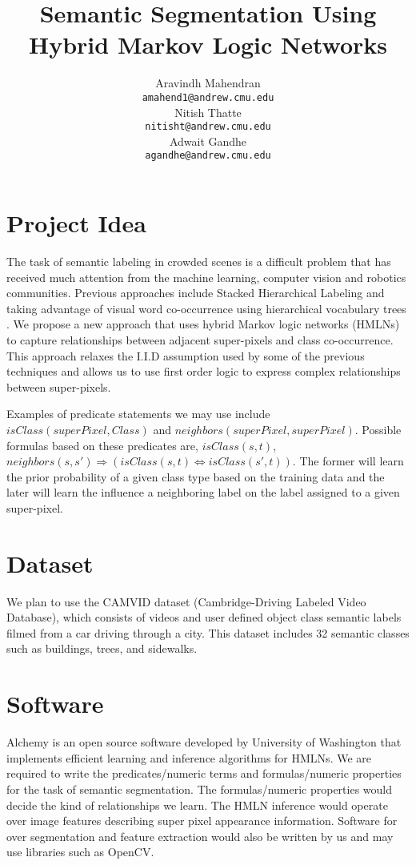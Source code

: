 \documentclass{article} %
\title{Semantic Segmentation Using Hybrid Markov Logic Networks}
\author{
Aravindh Mahendran \\
\texttt{amahend1@andrew.cmu.edu} \\ 
\And
Nitish Thatte \\
\texttt{nitisht@andrew.cmu.edu} \\
\AND
Adwait Gandhe \\
\texttt{agandhe@andrew.cmu.edu} \\
}
\begin{document}
\maketitle
\section{Project Idea}
\vspace{-0.125in}

The task of semantic labeling in crowded scenes is a difficult problem that has received much attention from the machine learning, computer vision and robotics communities. 
Previous approaches include Stacked Hierarchical Labeling \cite{Munoz:2010:SHL:1888212.1888218} and taking advantage of visual word co-occurrence using hierarchical vocabulary trees \cite{Micusik08032012}. 
We propose a new approach that uses hybrid Markov logic networks (HMLNs) \cite{Wang:2008:HML:1620163.1620244} to capture relationships between adjacent super-pixels and class co-occurrence.
This approach relaxes the I.I.D assumption used by some of the previous techniques and allows us to use first order logic to express complex relationships between super-pixels.

Examples of predicate statements we may use include $isClass(superPixel, Class)$ and $neighbors(superPixel, superPixel)$. Possible formulas based on these predicates are, $isClass(s,t)$, $neighbors(s,s') \Rightarrow \left( isClass(s, t) \Leftrightarrow isClass(s', t) \right)$. The former will learn the prior probability of a given class type based on the training data and the later will learn the influence a neighboring label on the label assigned to a given super-pixel. 
	
\vspace{-0.125in}
\section{Dataset}
\vspace{-0.125in}
We plan to use the CAMVID dataset (Cambridge-Driving Labeled Video Database), which consists of videos and user defined object class semantic labels filmed from a car driving through a city.
This dataset includes 32 semantic classes such as buildings, trees, and sidewalks. 

\vspace{-0.125in}
\section{Software}
\vspace{-0.125in}
Alchemy is an open source software developed by University of Washington that implements efficient learning and inference algorithms for HMLNs. We are required to write the predicates/numeric terms and formulas/numeric properties for the task of semantic segmentation. The formulas/numeric properties would decide the kind of relationships we learn. The HMLN inference would operate over image features describing super pixel appearance information. Software for over segmentation and feature extraction would also be written by us and may use libraries such as OpenCV.
\end{document}
